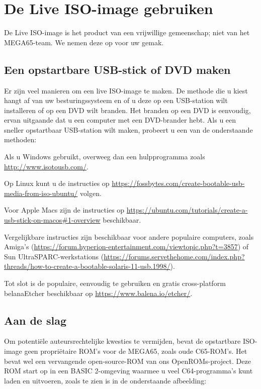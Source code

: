 \section{De Live ISO-image gebruiken}
\label{sec:live-iso-image}

De Live ISO-image is het product van een vrijwillige gemeenschap; niet van het MEGA65-team. We nemen deze op voor uw gemak.

\subsection{Een opstartbare USB-stick of DVD maken}

Er zijn veel manieren om een live ISO-image te maken. De methode die u kiest hangt af van uw besturingssysteem en of u deze op een USB-station wilt installeren of op een DVD wilt branden. Het branden op een DVD is eenvoudig, ervan uitgaande dat u een computer met een DVD-brander hebt. Als u een sneller opstartbaar USB-station wilt maken, probeert u een van de onderstaande methoden:

Als u Windows gebruikt, overweeg dan een hulpprogramma zoals \url{http://www.isotousb.com/}.

Op Linux kunt u de instructies op \url{https://fossbytes.com/create-bootable-usb-media-from-iso-ubuntu/} volgen.

Voor Apple Macs zijn de instructies op
\url{https://ubuntu.com/tutorials/create-a-usb-stick-on-macos#1-overview} beschikbaar.

Vergelijkbare instructies zijn beschikbaar voor andere populaire computers, zoals Amiga's (\url{https://forum.hyperion-entertainment.com/viewtopic.php?t=3857}) of Sun UltraSPARC-werkstations (\url{https://forums.servethehome.com/index.php?threads/how-to-create-a-bootable-solaris-11-usb.1998/}).

Tot slot is de populaire, eenvoudig te gebruiken en gratis cross-platform belanaEtcher beschikbaar op \url{https://www.balena.io/etcher/}.

\subsection{Aan de slag}

Om potentiële auteursrechtelijke kwesties te vermijden, bevat de opstartbare ISO-image geen propriëtaire ROM's voor de MEGA65, zoals oude C65-ROM's. Het bevat wel een vervangende open-source-ROM van ons OpenROMs-project. Deze ROM start op in een BASIC 2-omgeving waarmee u veel C64-programma's kunt laden en uitvoeren, zoals te zien is in de onderstaande afbeelding:

